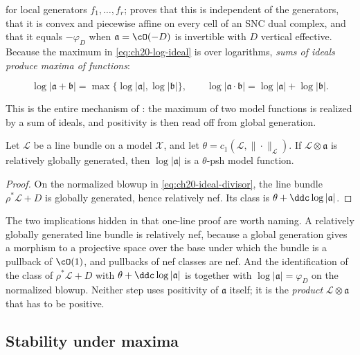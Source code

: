 for local generators \(f_1,\dots,f_r\); 
proves that this is independent of the generators, that it is convex and
piecewise affine on every cell of an SNC dual complex, and that it equals
\(-\varphi_D\) when \(\mathfrak a=\cO(-D)\) is invertible with \(D\)
vertical effective.  Because the maximum in \eqref{eq:ch20-log-ideal} is
over logarithms, \emph{sums of ideals produce maxima of functions}:

\begin{equation}
\label{eq:ch20-ideal-sum-max}
 \log|\mathfrak a+\mathfrak b|
 =\max\{\log|\mathfrak a|,\log|\mathfrak b|\},
 \qquad
 \log|\mathfrak a\cdot\mathfrak b|
 =\log|\mathfrak a|+\log|\mathfrak b| .
\end{equation}

This is the entire mechanism of : the maximum of
two model functions is realized by a sum of ideals, and positivity is then
read off from global generation.

\begin{lemma}\label{lem:ch20-generated-ideal-psh}
Let \(\mathcal L\) be a line bundle on a model \(\mathcal X\), and let
\(\theta=c_1(\mathcal L,\|\cdot\|_{\mathcal L})\).  If
\(\mathcal L\otimes\mathfrak a\) is relatively globally generated, then
\(\log|\mathfrak a|\) is a \(\theta\)-psh model function.
\end{lemma}

\begin{proof}
On the normalized blowup in \eqref{eq:ch20-ideal-divisor}, the line bundle
\(\rho^*\mathcal L+D\) is globally generated, hence relatively nef.  Its
class is \(\theta+\ddc\log|\mathfrak a|\).
\end{proof}

The two implications hidden in that one-line proof are worth naming.  A
relatively globally generated line bundle is relatively nef, because a
global generation gives a morphism to a projective space over the base under
which the bundle is a pullback of \(\cO(1)\), and pullbacks of nef classes
are nef.  And the identification of the class of \(\rho^*\mathcal L+D\) with
\(\theta+\ddc\log|\mathfrak a|\) is
 together with
\(\log|\mathfrak a|=\varphi_D\) on the normalized blowup.  Neither step uses
positivity of \(\mathfrak a\) itself; it is the \emph{product}
\(\mathcal L\otimes\mathfrak a\) that has to be positive.

\subsection{Stability under maxima}
\label{sec:ch20-max}

